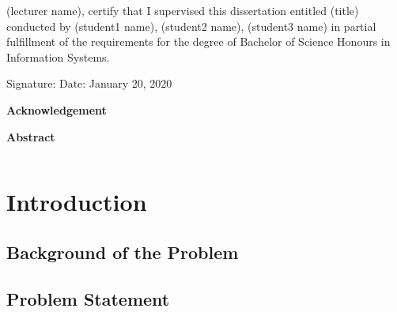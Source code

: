 \documentclass[12pt,a4paper]{report}
\begin{document}
\noindent (lecturer name), certify that I supervised this dissertation entitled (title)
conducted by (student1 name), (student2 name), (student3 name) in partial
fulfillment of the requirements for the degree of Bachelor of Science Honours in Information
Systems.
\vspace{0.5cm}

\noindent 
Signature:
\vspace{0.3cm}
\newline
\noindent
Date: January 20, 2020
\vspace{2cm}

\newpage

\thispagestyle{empty}
\newpage

\begin{center}
\textbf{\Large{Acknowledgement}}
\end{center}
\vspace{0.7cm}
\par
\newpage

\thispagestyle{empty}
\begin{center}
\textbf{\Large{Abstract}}\thispagestyle{empty}
\end{center}
\vspace{0.7cm}
\par
\newpage

\tableofcontents
{}
\clearpage

\listoffigures
{}

\listoftables
{}


\begin{tabular}{ll}

\end{tabular}
\clearpage


\chapter{Introduction}
\section{Background of the Problem}
\section{Problem Statement}
\end{document}

